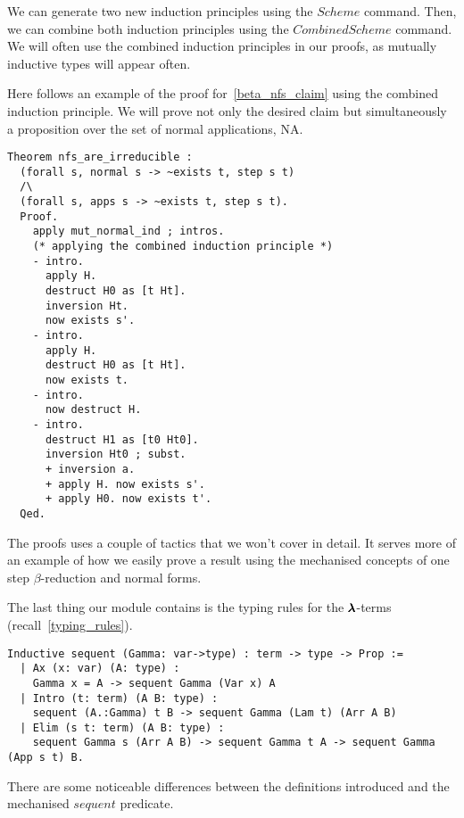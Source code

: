 We can generate two new induction principles using the \lst$Scheme$ command.
Then, we can combine both induction principles using the \lst$Combined Scheme$ command.
We will often use the combined induction principles in our proofs, as mutually inductive types will appear often. 

Here follows an example of the proof for~\cref{beta_nfs_claim} using the combined induction principle.
We will prove not only the desired claim but simultaneously a proposition over the set of normal applications, NA.

\begin{lstlisting}[language=Coq]
  Theorem nfs_are_irreducible :
  (forall s, normal s -> ~exists t, step s t)
  /\
  (forall s, apps s -> ~exists t, step s t).
  Proof.
    apply mut_normal_ind ; intros.
    (* applying the combined induction principle *)
    - intro.
      apply H.
      destruct H0 as [t Ht].
      inversion Ht.
      now exists s'.
    - intro.
      apply H.
      destruct H0 as [t Ht].
      now exists t.
    - intro.
      now destruct H.
    - intro.
      destruct H1 as [t0 Ht0].
      inversion Ht0 ; subst.
      + inversion a.
      + apply H. now exists s'.
      + apply H0. now exists t'.
  Qed.
\end{lstlisting}

The proofs uses a couple of tactics that we won't cover in detail.
It serves more of an example of how we easily prove a result using the mechanised concepts of one step $\beta$-reduction and normal forms.

The last thing our module contains is the typing rules for the $\pmb{\lambda}$-terms (recall~\cref{typing_rules}).

\begin{lstlisting}[language=Coq]
  Inductive sequent (Gamma: var->type) : term -> type -> Prop := 
  | Ax (x: var) (A: type) :
    Gamma x = A -> sequent Gamma (Var x) A
  | Intro (t: term) (A B: type) :
    sequent (A.:Gamma) t B -> sequent Gamma (Lam t) (Arr A B)
  | Elim (s t: term) (A B: type) :
    sequent Gamma s (Arr A B) -> sequent Gamma t A -> sequent Gamma (App s t) B.
\end{lstlisting}

There are some noticeable differences between the definitions introduced and the mechanised \lst$sequent$ predicate.

